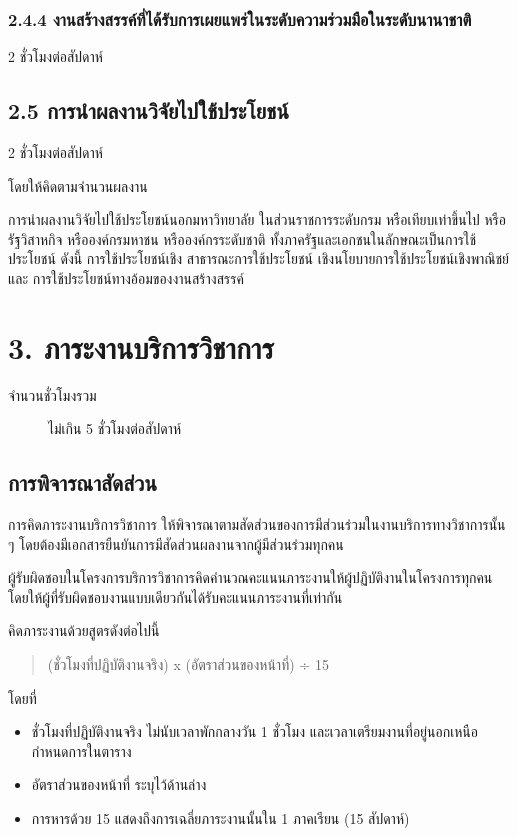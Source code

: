 \documentclass[a4paper,12pt,english]{sphinxmanual}
\begin{document}
\subsection{2.4.4 งานสร้างสรรค์ที่ได้รับการเผยแพร่ในระดับความร่วมมือในระดับนานาชาติ}
\label{\detokenize{2research:id29}}
2 ชั่วโมงต่อสัปดาห์


\section{2.5 การนำผลงานวิจัยไปใช้ประโยชน์}
\label{\detokenize{2research:id30}}
2 ชั่วโมงต่อสัปดาห์

โดยให้คิดตามจำนวนผลงาน

การนำผลงานวิจัยไปใช้ประโยชน์นอกมหาวิทยาลัย ในส่วนราชการระดับกรม หรือเทียบเท่าขึ้นไป หรือรัฐวิสาหกิจ หรือองค์กรมหาชน หรือองค์กรระดับชาติ ทั้งภาครัฐและเอกชนในลักษณะเป็นการใช้ประโยชน์ ดังนี้ การใช้ประโยชน์เชิง สาธารณะการใช้ประโยชน์ เชิงนโยบายการใช้ประโยชน์เชิงพาณิชย์ และ การใช้ประโยชน์ทางอ้อมของงานสร้างสรรค์


\chapter{3. ภาระงานบริการวิชาการ}
\label{\detokenize{3service:id1}}\label{\detokenize{3service::doc}}\begin{description}
\item[{จำนวนชั่วโมงรวม}] \leavevmode
ไม่เกิน 5 ชั่วโมงต่อสัปดาห์

\end{description}


\section{การพิจารณาสัดส่วน}
\label{\detokenize{3service:id2}}
การคิดภาระงานบริการวิชาการ ให้พิจารณาตามสัดส่วนของการมีส่วนร่วมในงานบริการทางวิชาการนั้น ๆ โดยต้องมีเอกสารยืนยันการมีสัดส่วนผลงานจากผู้มีส่วนร่วมทุกคน

ผู้รับผิดชอบในโครงการบริการวิชาการคิดคำนวณคะแนนภาระงานให้ผู้ปฏิบัติงานในโครงการทุกคน โดยให้ผู้ที่รับผิดชอบงานแบบเดียวกันได้รับคะแนนภาระงานที่เท่ากัน

คิดภาระงานด้วยสูตรดังต่อไปนี้
\begin{quote}

(ชั่วโมงที่ปฏิบัติงานจริง) x (อัตราส่วนของหน้าที่) ÷ 15
\end{quote}

โดยที่
\begin{itemize}
\item {} 
ชั่วโมงที่ปฏิบัติงานจริง ไม่นับเวลาพักกลางวัน 1 ชั่วโมง และเวลาเตรียมงานที่อยู่นอกเหนือกำหนดการในตาราง

\item {} 
อัตราส่วนของหน้าที่ ระบุไว้ด้านล่าง

\item {} 
การหารด้วย 15 แสดงถึงการเฉลี่ยภาระงานนั้นใน 1 ภาคเรียน (15 สัปดาห์)

\end{itemize}
\end{document}
